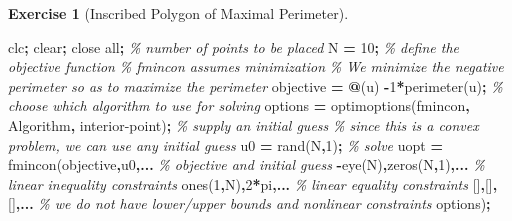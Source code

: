 \documentclass[
]{book}
\newenvironment{Shaded}{\begin{snugshade}}{\end{snugshade}}
\newcommand{\CommentTok}[1]{\textcolor[rgb]{0.56,0.35,0.01}{\textit{#1}}}
\newcommand{\FloatTok}[1]{\textcolor[rgb]{0.00,0.00,0.81}{#1}}
\newcommand{\NormalTok}[1]{#1}
\newcommand{\OperatorTok}[1]{\textcolor[rgb]{0.81,0.36,0.00}{\textbf{#1}}}
\newcommand{\SpecialStringTok}[1]{\textcolor[rgb]{0.31,0.60,0.02}{#1}}
\newcommand{\VariableTok}[1]{\textcolor[rgb]{0.00,0.00,0.00}{#1}}
\theoremstyle{definition}
\theoremstyle{definition}
\theoremstyle{definition}
\newtheorem{exercise}{Exercise}[chapter]
\theoremstyle{definition}
\theoremstyle{remark}
\begin{document}
\begin{exercise}[Inscribed Polygon of Maximal Perimeter]
\begin{Shaded}
\begin{Highlighting}[]
\VariableTok{clc}\OperatorTok{;} \VariableTok{clear}\OperatorTok{;} \VariableTok{close} \VariableTok{all}\OperatorTok{;}
\CommentTok{\% number of points to be placed}
\VariableTok{N} \OperatorTok{=} \FloatTok{10}\OperatorTok{;}
\CommentTok{\% define the objective function}
\CommentTok{\% fmincon assumes minimization}
\CommentTok{\% We minimize the negative perimeter so as to maximize the perimeter}
\VariableTok{objective} \OperatorTok{=} \OperatorTok{@}\NormalTok{(}\VariableTok{u}\NormalTok{) }\OperatorTok{{-}}\FloatTok{1}\OperatorTok{*}\VariableTok{perimeter}\NormalTok{(}\VariableTok{u}\NormalTok{)}\OperatorTok{;}
\CommentTok{\% choose which algorithm to use for solving}
\VariableTok{options} \OperatorTok{=} \VariableTok{optimoptions}\NormalTok{(}\SpecialStringTok{\textquotesingle{}fmincon\textquotesingle{}}\OperatorTok{,} \SpecialStringTok{\textquotesingle{}Algorithm\textquotesingle{}}\OperatorTok{,} \SpecialStringTok{\textquotesingle{}interior{-}point\textquotesingle{}}\NormalTok{)}\OperatorTok{;}
\CommentTok{\% supply an initial guess}
\CommentTok{\% since this is a convex problem, we can use any initial guess}
\VariableTok{u0} \OperatorTok{=} \VariableTok{rand}\NormalTok{(}\VariableTok{N}\OperatorTok{,}\FloatTok{1}\NormalTok{)}\OperatorTok{;}
\CommentTok{\% solve}
\VariableTok{uopt} \OperatorTok{=} \VariableTok{fmincon}\NormalTok{(}\VariableTok{objective}\OperatorTok{,}\VariableTok{u0}\OperatorTok{,...} \CommentTok{\% objective and initial guess}
    \OperatorTok{{-}}\VariableTok{eye}\NormalTok{(}\VariableTok{N}\NormalTok{)}\OperatorTok{,}\VariableTok{zeros}\NormalTok{(}\VariableTok{N}\OperatorTok{,}\FloatTok{1}\NormalTok{)}\OperatorTok{,...} \CommentTok{\% linear inequality constraints}
    \VariableTok{ones}\NormalTok{(}\FloatTok{1}\OperatorTok{,}\VariableTok{N}\NormalTok{)}\OperatorTok{,}\FloatTok{2}\OperatorTok{*}\VariableTok{pi}\OperatorTok{,...} \CommentTok{\% linear equality constraints}
\NormalTok{    []}\OperatorTok{,}\NormalTok{[]}\OperatorTok{,}\NormalTok{[]}\OperatorTok{,...} \CommentTok{\% we do not have lower/upper bounds and nonlinear constraints}
    \VariableTok{options}\NormalTok{)}\OperatorTok{;}


\end{Highlighting}
\end{Shaded}
\end{exercise}
\end{document}
